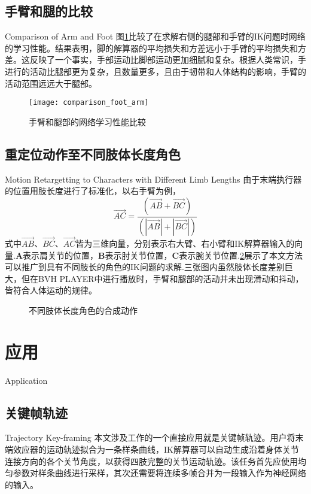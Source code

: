 \subsection{手臂和腿的比较}{Comparison of Arm and Foot}
图\ref{fig:comparison_foot_arm}比较了在求解右侧的腿部和手臂的IK问题时网络的学习性能。结果表明，脚的解算器的平均损失和方差远小于手臂的平均损失和方差。这反映了一个事实，手部运动比脚部运动更加细腻和复杂。根据人类常识，手进行的活动比腿部更为复杂，且数量更多，且由于韧带和人体结构的影响，手臂的活动范围远远大于腿部。
\begin{figure}[!htbp]
	\centering
	\texttt{[image: comparison\_foot\_arm]}
	\caption[]{\label{fig:comparison_foot_arm}
		手臂和腿部的网络学习性能比较
	}
\end{figure}
\subsection{重定位动作至不同肢体长度角色}{Motion Retargetting to Characters with Different Limb Lengths}
\label{sec:Retargetting}
由于末端执行器的位置用肢长度进行了标准化，以右手臂为例，
\begin{displaymath}
\overrightarrow{AC}=\frac{(\overrightarrow{AB}+\overrightarrow{BC})}{(\left|\overrightarrow{AB}\right|+\left|\overrightarrow{BC}\right|)}
\end{displaymath}
式中$\overrightarrow{AB}$、$\overrightarrow{BC}$、$\overrightarrow{AC}$皆为三维向量，分别表示右大臂、右小臂和IK解算器输入的向量.$\mathbf{A}$表示肩关节的位置，$\mathbf{B}$表示肘关节位置，$\mathbf{C}$表示腕关节位置.\cref{fig:limb_length}展示了本文方法可以推广到具有不同肢长的角色的IK问题的求解.三张图内虽然肢体长度差别巨大，但在BVH PLAYER中进行播放时，手臂和腿部的活动并未出现滑动和抖动，皆符合人体运动的规律。
\begin{figure}
\centering
{}
\caption{不同肢体长度角色的合成动作}
\label{fig:limb_length}
\end{figure}
\section{应用}{Application}
\subsection{关键帧轨迹}{Trajectory Key-framing}
本文涉及工作的一个直接应用就是关键帧轨迹。用户将末端效应器的运动轨迹拟合为一条样条曲线，IK解算器可以自动生成沿着身体关节连接方向的各个关节角度，以获得四肢完整的关节运动轨迹。该任务首先应使用均匀参数对样条曲线进行采样，其次还需要将连续多帧合并为一段输入作为神经网络的输入。

